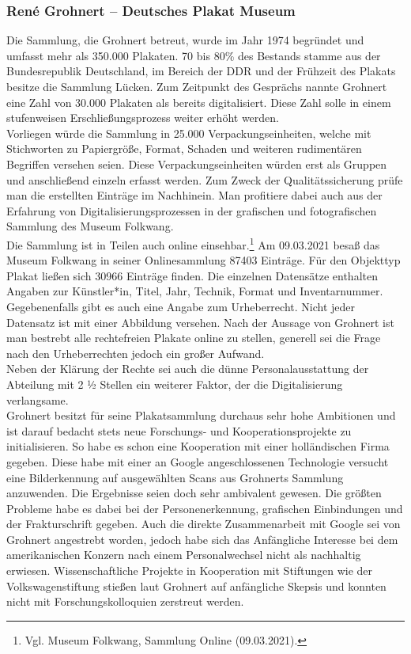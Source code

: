 \documentclass[a4paper,12pt,ngerman]{article}
\begin{document}
\subsubsection{René Grohnert -- Deutsches Plakat Museum}
Die Sammlung, die Grohnert betreut, wurde im Jahr 1974 begründet und umfasst mehr als 350.000 Plakaten. 70 bis 80\% des Bestands stamme aus der Bundesrepublik Deutschland, im Bereich der DDR und der Frühzeit des Plakats besitze die Sammlung Lücken. Zum Zeitpunkt des Gesprächs nannte Grohnert eine Zahl von 30.000 Plakaten als bereits digitalisiert. Diese Zahl solle in einem stufenweisen Erschließungsprozess weiter erhöht werden. \\
Vorliegen würde die Sammlung in 25.000 Verpackungseinheiten, welche mit Stichworten zu Papiergröße, Format, Schaden und weiteren rudimentären Begriffen versehen seien. Diese Verpackungseinheiten würden erst als Gruppen und anschließend einzeln erfasst werden. Zum Zweck der Qualitätssicherung prüfe man die erstellten Einträge im Nachhinein. Man profitiere dabei auch aus der Erfahrung von Digitalisierungsprozessen in der grafischen und fotografischen Sammlung des Museum Folkwang. \\
Die Sammlung ist in Teilen auch online einsehbar.\footnote{Vgl. Museum Folkwang, Sammlung Online (09.03.2021).}  Am 09.03.2021 besaß das Museum Folkwang in seiner Onlinesammlung 87403 Einträge. Für den Objekttyp Plakat ließen sich 30966 Einträge finden. Die einzelnen Datensätze enthalten Angaben zur Künstler*in, Titel, Jahr, Technik, Format und Inventarnummer. Gegebenenfalls gibt es auch eine Angabe zum Urheberrecht. Nicht jeder Datensatz ist mit einer Abbildung versehen. Nach der Aussage von Grohnert ist man bestrebt alle rechtefreien Plakate online zu stellen, generell sei die Frage nach den Urheberrechten jedoch ein großer Aufwand. \\
Neben der Klärung der Rechte sei auch die dünne Personalausstattung der Abteilung mit 2 ½ Stellen ein weiterer Faktor, der die Digitalisierung verlangsame. \\
Grohnert besitzt für seine Plakatsammlung durchaus sehr hohe Ambitionen und ist darauf bedacht stets neue Forschungs- und Kooperationsprojekte zu initialisieren. So habe es schon eine Kooperation mit einer holländischen Firma gegeben. Diese habe mit einer an Google angeschlossenen Technologie versucht eine Bilderkennung auf ausgewählten Scans aus Grohnerts Sammlung anzuwenden. Die Ergebnisse seien doch sehr ambivalent gewesen. Die größten Probleme habe es dabei bei der Personenerkennung, grafischen Einbindungen und der Frakturschrift gegeben. Auch die direkte Zusammenarbeit mit Google sei von Grohnert angestrebt worden, jedoch habe sich das Anfängliche Interesse bei dem amerikanischen Konzern nach einem Personalwechsel nicht als nachhaltig erwiesen. Wissenschaftliche Projekte in Kooperation mit Stiftungen wie der Volkswagenstiftung stießen laut Grohnert auf anfängliche Skepsis und konnten nicht mit Forschungskolloquien zerstreut werden. \\
\end{document}
